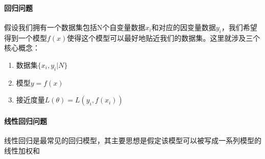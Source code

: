 \paragraph{回归问题}

假设我们拥有一个数据集包括N个自变量数据$x_i$和对应的因变量数据$y_i$，我们希望得到一个模型$f(x)$使得这个模型可以最好地贴近我们的数据集。这里就涉及三个核心概念：

\begin{enumerate}
    \item 数据集$\{x_i,y_i|N\}$
    \item 模型$y=f(x)$
    \item 接近度量$L(\theta)=L(y_i,f(x_i))$
\end{enumerate}

\paragraph{线性回归问题}

线性回归是最常见的回归模型，其主要思想是假定该模型可以被写成一系列模型的线性加权和



